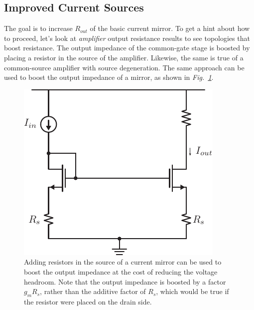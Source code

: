 \subsection{Improved Current Sources}
The goal is to increase $R_{out}$ of the basic current mirror.  To get a hint about how to proceed, let's look at \textit{amplifier} output resistance results to see topologies that boost resistance.  The output impedance of the common-gate stage is boosted by placing a resistor in the source of the amplifier.  Likewise, the same is true of a common-source amplifier with source degeneration.  The same approach can be used to boost the output impedance of a mirror, as shown in \emph{Fig.~\ref{fig:9mirror_Rs.pdf}}.
\begin{figure}[tb]
\centering
\includegraphics[scale=1]{9mirror_Rs.pdf}
\caption{Adding resistors in the source of a current mirror can be used to boost the output impedance at the cost of reducing the voltage headroom.  Note that the output impedance is boosted by a factor $g_m R_s$, rather than the additive factor of $R_s$, which would be true if the resistor were placed on the drain side.}
\label{fig:9mirror_Rs.pdf}
\end{figure}
